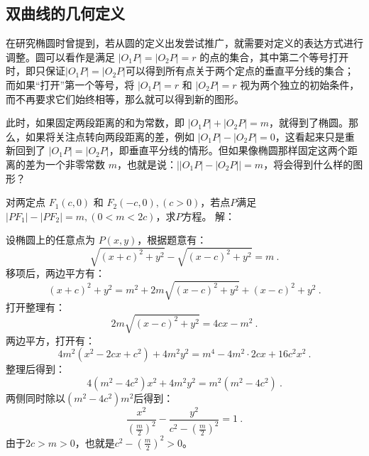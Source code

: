 \subsection{双曲线的几何定义}

在研究椭圆时曾提到，若从圆的定义出发尝试推广，就需要对定义的表达方式进行调整。圆可以看作是满足 $|O_1P| = |O_2P| = r$ 的点的集合，其中第二个等号打开时，即只保证$|O_1P| = |O_2P|$可以得到所有点关于两个定点的垂直平分线的集合；而如果“打开”第一个等号，将 $|O_1P| = r$ 和 $|O_2P| = r$ 视为两个独立的初始条件，而不再要求它们始终相等，那么就可以得到新的图形。

此时，如果固定两段距离的和为常数，即 $|O_1P| + |O_2P| = m$，就得到了椭圆。那么，如果将关注点转向两段距离的差，例如 $|O_1P| - |O_2P| = 0$，这看起来只是重新回到了 $|O_1P| = |O_2P|$，即垂直平分线的情形。但如果像椭圆那样固定这两个距离的差为一个非零常数 $m$，也就是说：$\left||O_1P| - |O_2P|\right| = m$，将会得到什么样的图形？

\begin{example}{对两定点 $F_1(c, 0)$ 和 $F_2(-c, 0),(c>0)$，若点$P$满足$|PF_1| - |PF_2| = m,(0<m <2c)$，求$P$方程。}
解：

设椭圆上的任意点为 $P(x, y)$，根据题意有：
\begin{equation}
\sqrt{(x + c)^2 + y^2} - \sqrt{(x - c)^2 + y^2} = m~.
\end{equation}
移项后，两边平方有：
\begin{equation}
(x + c)^2 + y^2 = m^2 + 2m\sqrt{(x - c)^2 + y^2} + (x - c)^2 + y^2~.
\end{equation}
打开整理有：
\begin{equation}
2m\sqrt{(x - c)^2 + y^2}= 4cx - m^2~.
\end{equation}
两边平方，打开有：
\begin{equation}\label{eq_Hypb3_6}
4m^2(x^2 - 2cx+c^2) + 4m^2y^2= m^4-4m^2\cdot2cx+16c^2x^2~.
\end{equation}
整理后得到：
\begin{equation}
4(m^2 -4c^2)x^2 + 4m^2y^2= m^2(m^2-4c^2)~.
\end{equation}
两侧同时除以$(m^2-4c^2)m^2$后得到：
\begin{equation}\label{eq_Hypb3_3}
\frac{x^2}{\left(\displaystyle\frac{m}{2}\right)^2} -\frac{y^2}{\displaystyle c^2-\left(\frac{m}{2}\right)^2}=1~.
\end{equation}
由于$2c>m>0$，也就是$\displaystyle c^2-\left(\frac{m}{2}\right)^2>0$。
\end{example}

